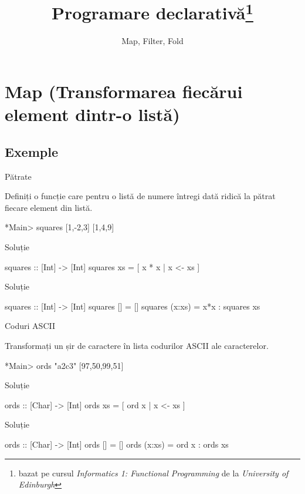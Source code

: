 \documentclass[handout,xcolor=pdftex,romanian,colorlinks]{beamer}
\title[PD---Funcții de ordin înalt]{Programare declarativă\thanks{bazat pe cursul \emph{Informatics 1: Functional Programming} de la \emph{University of Edinburgh}}}
\subtitle{Map, Filter, Fold}
\begin{document}
\begin{frame}
  \titlepage
\end{frame}

\section{Map (Transformarea fiecărui element dintr-o listă)}

\subsection{Exemple}

\begin{frame}[fragile]{Pătrate}
\begin{block}{}
Definiți o funcție care pentru o listă de numere întregi dată  ridică la pătrat fiecare element din listă.
\begin{asciihs}
*Main> squares [1,-2,3]
[1,4,9]
\end{asciihs}
\end{block}
\begin{block}{Soluție }
\begin{asciihs}
squares :: [Int] -> [Int]
squares xs = [ x * x | x <- xs ]
\end{asciihs}
\end{block}
\begin{block}{Soluție }
\begin{asciihs}
squares :: [Int] -> [Int]
squares []     = []
squares (x:xs) = x*x : squares xs
\end{asciihs}
\end{block}
\end{frame}

\begin{frame}[fragile]
{Coduri ASCII}
\begin{block}{}
Transformați un șir de caractere în lista codurilor ASCII ale caracterelor.
\begin{asciihs}
*Main> ords "a2c3"
[97,50,99,51]
\end{asciihs}
\end{block}
\begin{block}{Soluție }
\begin{asciihs}
ords :: [Char] -> [Int]
ords xs = [ ord x | x <- xs ]
\end{asciihs}
\end{block}
\begin{block}{Soluție }
\begin{asciihs}
ords :: [Char] -> [Int]
ords []     = []
ords (x:xs) = ord x : ords xs
\end{asciihs}
\end{block}
\end{frame}
\end{document}
